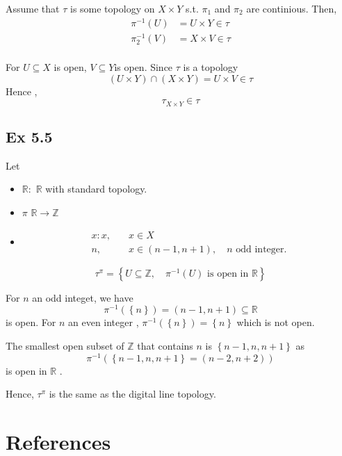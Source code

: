 \documentclass{article}
\theoremstyle{remark}
\newcommand{\newpara}
    {
    \vskip 0.4cm
    }
\begin{document}
\newpara

Assume that $\tau $  is some topology on $X \times  Y$ s.t. $\pi _{1}$  and $\pi _{2}$ are continious. Then, \[
\begin{split}
    \pi ^{-1}\left( U \right) &=  U \times Y \in \tau  \\
    \pi _{2}^{-1} \left( V \right) &=  X \times  V \in  \tau \\
\end{split}
\]

For $U \subseteq X$ is open, $V \subseteq Y$is open. Since $\tau $ is a topology \[
    \left( U \times Y \right) \cap \left( X \times Y \right) = U \times V \in  \tau
\]
Hence ,
\[
\tau _{X \times Y} \in \tau
\]

\subsection*{Ex 5.5}%
\label{sub:ex_5_8}

Let
\begin{itemize}
    \item $\mathbb{R} :$   $\mathbb{R} $   with standard topology.
    \item $\pi $   $\mathbb{R} \to \mathbb{Z} $
    \item \begin{align*}
        x: x, \quad  & x \in X  \\
          n , \quad&   x \in \left( n-1, n+1 \right) , \quad  n \text{ odd integer}
    .\end{align*}
\end{itemize}


\[
\tau ^{\pi } = \left\{ U \subseteq \mathbb{Z} , \quad \pi ^{-1} \left( U \right) \text{ is open in }\mathbb{R}  \right\}
\]

For $n$  an odd integet, we have \[
    \pi ^{-1}\left( \left\{ n \right\} \right) = \left( n-1, n+1 \right) \subseteq \mathbb{R}
\]
is open. For $n$  an even integer , $\pi ^{-1} \left( \left\{ n \right\} \right) = \left\{ n \right\}$ which is not
open.
\newpara

The smallest open subset of $\mathbb{Z} $ that contains $n$  is $\left\{ n-1, n, n+1 \right\}$ as \[
\pi ^{-1} \left( \left\{ n-1, n, n+1 \right\} = \left( n-2, n+2 \right) \right)
\]
is open in $\mathbb{R} $ .

Hence, $\tau ^{\pi }$  is the same as the digital line topology.





\newpage

\section{References}%
\label{sec:references}



\end{document}
